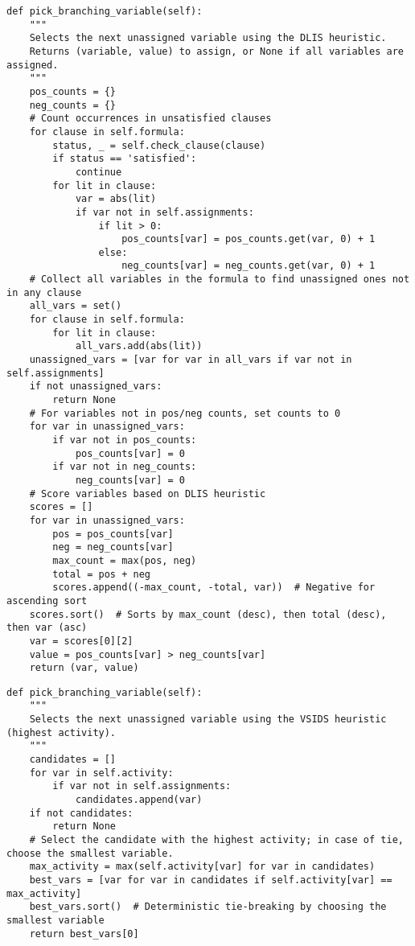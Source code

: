 \begin{lstlisting}
def pick_branching_variable(self):
    """
    Selects the next unassigned variable using the DLIS heuristic.
    Returns (variable, value) to assign, or None if all variables are assigned.
    """
    pos_counts = {}
    neg_counts = {}
    # Count occurrences in unsatisfied clauses
    for clause in self.formula:
        status, _ = self.check_clause(clause)
        if status == 'satisfied':
            continue
        for lit in clause:
            var = abs(lit)
            if var not in self.assignments:
                if lit > 0:
                    pos_counts[var] = pos_counts.get(var, 0) + 1
                else:
                    neg_counts[var] = neg_counts.get(var, 0) + 1
    # Collect all variables in the formula to find unassigned ones not in any clause
    all_vars = set()
    for clause in self.formula:
        for lit in clause:
            all_vars.add(abs(lit))
    unassigned_vars = [var for var in all_vars if var not in self.assignments]
    if not unassigned_vars:
        return None
    # For variables not in pos/neg counts, set counts to 0
    for var in unassigned_vars:
        if var not in pos_counts:
            pos_counts[var] = 0
        if var not in neg_counts:
            neg_counts[var] = 0
    # Score variables based on DLIS heuristic
    scores = []
    for var in unassigned_vars:
        pos = pos_counts[var]
        neg = neg_counts[var]
        max_count = max(pos, neg)
        total = pos + neg
        scores.append((-max_count, -total, var))  # Negative for ascending sort
    scores.sort()  # Sorts by max_count (desc), then total (desc), then var (asc)
    var = scores[0][2]
    value = pos_counts[var] > neg_counts[var]
    return (var, value)

\end{lstlisting}


\begin{lstlisting}
def pick_branching_variable(self):
    """
    Selects the next unassigned variable using the VSIDS heuristic (highest activity).
    """
    candidates = []
    for var in self.activity:
        if var not in self.assignments:
            candidates.append(var)
    if not candidates:
        return None
    # Select the candidate with the highest activity; in case of tie, choose the smallest variable.
    max_activity = max(self.activity[var] for var in candidates)
    best_vars = [var for var in candidates if self.activity[var] == max_activity]
    best_vars.sort()  # Deterministic tie-breaking by choosing the smallest variable
    return best_vars[0]
\end{lstlisting}


